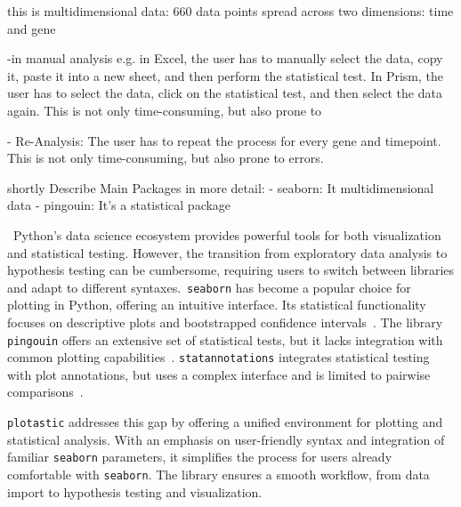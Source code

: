 this is multidimensional data:  660 data points spread across two dimensions: time
and gene

-in manual analysis e.g. in Excel, the user has to manually select the
data, copy it, paste it into a new sheet, and then perform the
statistical test. In Prism, the user has to select the data, click on
the statistical test, and then select the data again. This is not only
time-consuming, but also prone to

- Re-Analysis: The user has to repeat the process for every gene and
timepoint. This is not only time-consuming, but also prone to errors.

shortly Describe Main Packages in more detail:
- seaborn: It multidimensional data
- pingouin: It's a statistical package







\ Python's data science ecosystem provides powerful tools for both visualization
and statistical testing. However, the transition from exploratory data analysis
to hypothesis testing can be cumbersome, requiring users to switch between
libraries and adapt to different syntaxes.~\texttt{seaborn} has become a popular
choice for plotting in Python, offering an intuitive interface. Its statistical
functionality focuses on descriptive plots and bootstrapped confidence
intervals~\cite{waskomSeabornStatisticalData2021}. The library \texttt{pingouin}
offers an extensive set of statistical tests, but it lacks integration with
common plotting capabilities~\cite{vallatPingouinStatisticsPython2018}.
\texttt{statannotations} integrates statistical testing with plot annotations,
but uses a complex interface and is limited to pairwise
comparisons~\cite{charlierTrevismdStatannotationsV02022}.

\texttt{plotastic} addresses this gap by offering a unified environment for
plotting and statistical analysis. With an emphasis on user-friendly
syntax and integration of familiar \texttt{seaborn} parameters, it simplifies
the process for users already comfortable with \texttt{seaborn}. The library
ensures a smooth workflow, from data import to hypothesis testing and
visualization.






